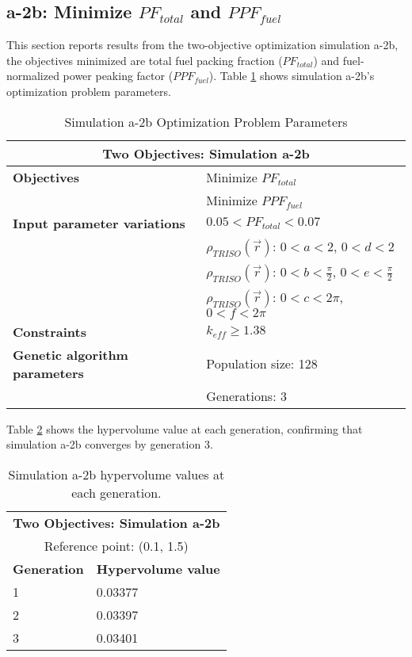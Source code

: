 \subsection{a-2b: Minimize $PF_{total}$ and $PPF_{fuel}$}
\label{sec:a-2b}
This section reports results from the two-objective optimization simulation a-2b, the 
objectives minimized are total fuel packing fraction ($PF_{total}$) and fuel-normalized 
power peaking factor ($PPF_{fuel}$).  
Table \ref{tab:simulationa2b} shows simulation a-2b's optimization problem parameters. 
\begin{table}[htbp!]
    \centering
    \onehalfspacing
    \caption{Simulation a-2b Optimization Problem Parameters}
	\label{tab:simulationa2b}
    \footnotesize
    \begin{tabular}{l|p{5.3cm}}
    \hline 
    \multicolumn{2}{c}{\textbf{Two Objectives: Simulation a-2b}} \\
    \hline 
    \textbf{Objectives} & Minimize $PF_{total}$ \\
    & Minimize $PPF_{fuel}$ \\
    \hline 
    \textbf{Input parameter variations} & $0.05<PF_{total}<0.07$ \\
    & $\rho_{TRISO}(\vec{r})$: $0<a<2$, $0<d<2$\\
    & $\rho_{TRISO}(\vec{r})$: $0<b<\frac{\pi}{2}$, $0<e<\frac{\pi}{2}$\\
    & $\rho_{TRISO}(\vec{r})$: $0<c<2\pi$, $0<f<2\pi$\\
    \hline
    \textbf{Constraints} & $k_{eff} \geq 1.38$\\ 
    \hline 
    \textbf{Genetic algorithm parameters} & Population size: 128 \\
    & Generations: 3 \\
    \hline
    \end{tabular}
\end{table}

Table \ref{tab:a2b-hypervolume} shows the hypervolume value at each generation, 
confirming that simulation a-2b converges by generation 3. 
\begin{table}[htbp!]
    \centering
    \onehalfspacing
    \caption{Simulation a-2b hypervolume values at each generation.}
	\label{tab:a2b-hypervolume}
    \footnotesize
    \begin{tabular}{ll}
    \hline 
    \multicolumn{2}{c}{\textbf{Two Objectives: Simulation a-2b}} \\
    \multicolumn{2}{c}{Reference point: (0.1, 1.5)} \\
    \hline 
    \textbf{Generation} & \textbf{Hypervolume value} \\
    \hline
    1 & 0.03377 \\
    2 & 0.03397 \\
    3 & 0.03401 \\
    \hline
    \end{tabular}
\end{table}

